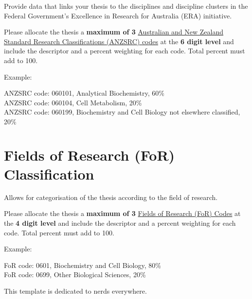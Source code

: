 \begin{instructional}
Provide data that links your thesis to the disciplines and discipline clusters in the Federal Government’s Excellence in Research for Australia (ERA) initiative.

Please allocate the thesis a \textbf{maximum of 3} \href{http://www.abs.gov.au/Ausstats/abs@.nsf/Latestproducts/6BB427AB9696C225CA2574180004463E?opendocument}{Australian and New Zealand Standard Research Classifications (ANZSRC) codes} at the \textbf{6 digit level} and include the descriptor and a percent weighting for each code. Total percent must add to 100.

Example:
\end{instructional}

\noindent
ANZSRC code: 060101, Analytical Biochemistry, 60\% \\
ANZSRC code: 060104, Cell Metabolism, 20\% \\
ANZSRC code: 060199, Biochemistry and Cell Biology not elsewhere classified, 20\%


\section*{Fields of Research (FoR) Classification}

\begin{instructional}
Allows for categorisation of the thesis according to the field of research. 

Please allocate the thesis a \textbf{maximum of 3} \href{http://www.abs.gov.au/Ausstats/abs@.nsf/Latestproducts/6BB427AB9696C225CA2574180004463E?opendocument}{Fields of Research (FoR) Codes} at the \textbf{4 digit level} and include the descriptor and a percent weighting for each code. Total percent must add to 100. 

Example:
\end{instructional}

FoR code: 0601, Biochemistry and Cell Biology, 80\% \\
FoR code: 0699, Other Biological Sciences, 20\%

\clearpage

	\rmfamily
	\normalfont

	\begin{vplace}[1]
		\begin{center}
			This template is dedicated to nerds everywhere.
		\end{center}
	\end{vplace}


\clearpage
\pagestyle{headings}

\tableofcontents
	\clearpage
\listoffigures
	\clearpage
\listoftables



